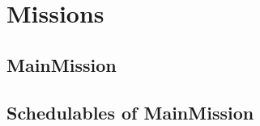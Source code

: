 \documentclass[10pt,a4paper]{article}
\begin{document}
\section{Missions}


\subsection{MainMission}

\newpage
{}
\newpage

\subsection{Schedulables of MainMission}
\end{document}
